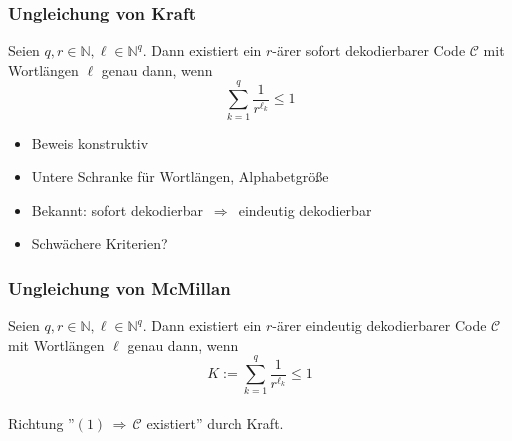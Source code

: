 \documentclass{beamer}
\begin{document}
\begin{frame}[t]
    \frametitle{Ungleichung von Kraft}
    Seien $q,r \in \mathbb{N}, \ell \in \mathbb{N}^q$. Dann existiert ein $r$-ärer sofort dekodierbarer Code $\mathcal{C}$
    mit Wortlängen $\ell$ genau dann, wenn
    $$
        \sum_{k=1}^{q} \frac{1}{r^{\ell_k}} \leq 1
    $$
    \begin{itemize}
        \setlength\itemsep{1em}
        \item Beweis konstruktiv
        \item Untere Schranke für Wortlängen, Alphabetgröße
        \setlength\itemsep{3em}
        \pause
        \item Bekannt: sofort dekodierbar $\,\Longrightarrow\,$ eindeutig dekodierbar
        \setlength\itemsep{1em}
        \item Schwächere Kriterien?
    \end{itemize}
\end{frame}

\begin{frame}[t]
    \frametitle{Ungleichung von McMillan}
    Seien $q,r \in \mathbb{N}, \ell \in \mathbb{N}^q$.
    Dann existiert ein $r$-ärer {\color{red}eindeutig dekodierbarer} Code $\mathcal{C}$
    mit Wortlängen $\ell$ genau dann, wenn
    \begin{equation}
        K := \sum_{k=1}^{q} \frac{1}{r^{\ell_k}} \leq 1
    \end{equation}\\[20pt]

    Richtung ''$(1) \,\Longrightarrow\, \mathcal{C}$ existiert'' durch Kraft.\\
\end{frame}

\end{document}
